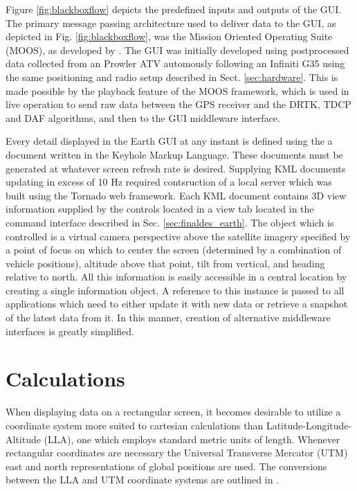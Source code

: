 \documentclass[12pt]{report}
\begin{document}
Figure \ref{fig:blackboxflow} depicts the predefined inputs and outputs of the GUI. The primary message passing architecture used to deliver data to the GUI, as depicted in Fig. \ref{fig:blackboxflow}, was the Mission Oriented Operating Suite (MOOS), as developed by \cite{moos}. The GUI was initially developed using postprocessed data collected from an Prowler ATV automously following an Infiniti G35 using the same positioning and radio setup described in Sect. \ref{sec:hardware}. This is made possible by the playback feature of the MOOS framework, which is used in live operation to send raw data between the GPS receiver and the DRTK, TDCP and DAF algorithms, and then to the GUI middleware interface.

Every detail displayed in the Earth GUI at any instant is defined using the a document written in the Keyhole Markup Language. These documents must be generated at whatever screen refresh rate is desired. Supplying KML documents updating in excess of 10 Hz required contsruction of a local server which was built using the Tornado web framework. Each KML document contains 3D view information supplied by the controls located in a view tab located in the command interface described in Sec. \ref{sec:finaldes_earth}. The object which is controlled is a virtual camera perspective above the satellite imagery specified by a point of focus on which to center the screen (determined by a combination of vehicle positions), altitude above that point, tilt from vertical, and heading relative to north.
All this information is easily accessible in a central location by creating a single information object. A reference to this instance is passed to all applications which need to either update it with new data or retrieve a snapshot of the latest data from it. In this manner, creation of alternative middleware interfaces is greatly simplified.

\section{Calculations} \label{sec:guicalc}

When displaying data on a rectangular screen, it becomes desirable to utilize a coordinate system more suited to cartesian calculations than Latitude-Longitude-Altitude (LLA), one which employs standard metric units of length. Whenever rectangular coordinates are necessary the Universal Transverse Mercator (UTM) east and north representations of global positions are used. The conversions between the LLA and UTM coordinate systems are outlined in \cite{projections}.
\end{document}
